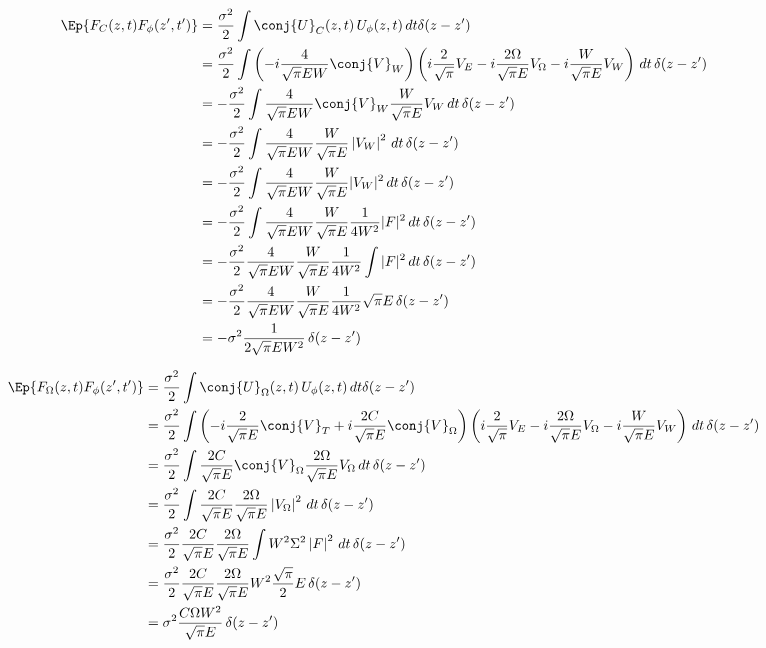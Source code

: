 \begin{equation}
\begin{split}
\Ep{F_C(z,t) F_\phi(z',t')} &= \frac{\sigma^2}{2} \int \conj{U}_C(z,t)\, U_\phi(z,t) \,dt \delta(z-z') \\
&= \frac{\sigma^2}{2} \int \left(-i \frac{4}{\sqrt{\pi} E W} \conj{V}_W\right)\left(i\frac{2}{\sqrt{\pi}} V_E - i \frac{2\Omega}{\sqrt{\pi} E} V_{\Omega} -i  \frac{W}{\sqrt{\pi} E} V_W \right)  \,dt \, \delta(z-z')\\
&= -\frac{\sigma^2}{2} \int \frac{4}{\sqrt{\pi} E W} \conj{V}_W  \frac{W}{\sqrt{\pi} E} V_W \,dt \, \delta(z-z')\\
&= -\frac{\sigma^2}{2} \int \frac{4}{\sqrt{\pi} E W}  \frac{W}{\sqrt{\pi} E} \left|V_W\right|^2 \,dt \, \delta(z-z')\\
&= -\frac{\sigma^2}{2} \int \frac{4}{\sqrt{\pi} E W} \frac{W}{\sqrt{\pi} E} |V_W|^2 \,dt \, \delta(z-z')\\
&= -\frac{\sigma^2}{2} \int \frac{4}{\sqrt{\pi} E W} \frac{W}{\sqrt{\pi} E} \frac{1}{4W^2} |F|^2 \,dt \, \delta(z-z')\\
&= -\frac{\sigma^2}{2}  \frac{4}{\sqrt{\pi} E W} \frac{W}{\sqrt{\pi} E} \frac{1}{4W^2} \int |F|^2 \,dt \, \delta(z-z')\\
&= -\frac{\sigma^2}{2}  \frac{4}{\sqrt{\pi} E W} \frac{W}{\sqrt{\pi} E} \frac{1}{4W^2} \sqrt{\pi}E \, \delta(z-z')\\
&= -\sigma^2  \frac{1}{2\sqrt{\pi} E W^2}\, \delta(z-z')\\
\end{split}
\end{equation}

\begin{equation}
\begin{split}
\Ep{F_\Omega(z,t) F_\phi(z',t')} &= \frac{\sigma^2}{2} \int \conj{U}_\Omega(z,t)\,U_\phi(z,t) \,dt \delta(z-z') \\
&= \frac{\sigma^2}{2} \int \left( -i \frac{2}{\sqrt{\pi}E } \conj{V}_T + i\frac{2C}{\sqrt{\pi}E } \conj{V}_\Omega\right) \left( i\frac{2}{\sqrt{\pi}} V_E - i \frac{2\Omega}{\sqrt{\pi} E} V_{\Omega}  - i  \frac{W}{\sqrt{\pi} E} V_W   \right) \,dt \, \delta(z-z')\\
 &= \frac{\sigma^2}{2} \int \frac{2C}{\sqrt{\pi}E } \conj{V}_\Omega \frac{2\Omega}{\sqrt{\pi} E} V_{\Omega}  \,dt \, \delta(z-z')\\
&= \frac{\sigma^2}{2} \int \frac{2C}{\sqrt{\pi}E } \frac{2\Omega}{\sqrt{\pi} E} \left| V_{\Omega}\right|^2  \,dt \, \delta(z-z')\\
&= \frac{\sigma^2}{2}  \frac{2C}{\sqrt{\pi}E } \frac{2\Omega}{\sqrt{\pi} E} \int W^2 \Sigma^2 \left| F\right|^2 \,dt \, \delta(z-z')\\
&= \frac{\sigma^2}{2}  \frac{2C}{\sqrt{\pi}E } \frac{2\Omega}{\sqrt{\pi} E}  W^2 \frac{\sqrt{\pi}}{2}E   \, \delta(z-z')\\
&= \sigma^2  \frac{C\Omega  W^2 }{\sqrt{\pi}E }    \, \delta(z-z')\\
\end{split}
\end{equation}


